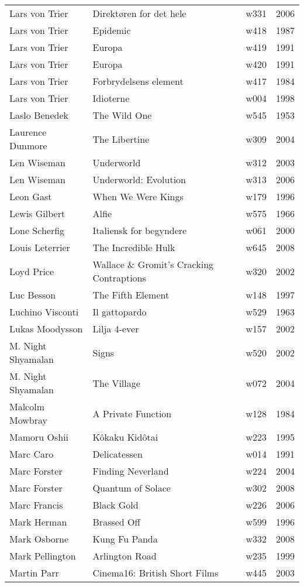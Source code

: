 \documentclass{article}
\begin{document}
\begin {center}
\begin{longtable}{l p{10cm} l l}
Lars von Trier & Direktøren for det hele & w331 & 2006 \\
Lars von Trier & Epidemic & w418 & 1987 \\
Lars von Trier & Europa & w419 & 1991 \\
Lars von Trier & Europa & w420 & 1991 \\
Lars von Trier & Forbrydelsens element & w417 & 1984 \\
Lars von Trier & Idioterne & w004 & 1998 \\
Laslo Benedek & The Wild One & w545 & 1953 \\
Laurence Dunmore & The Libertine & w309 & 2004 \\
Len Wiseman & Underworld & w312 & 2003 \\
Len Wiseman & Underworld: Evolution & w313 & 2006 \\
Leon Gast & When We Were Kings & w179 & 1996 \\
Lewis Gilbert & Alfie & w575 & 1966 \\
Lone Scherfig & Italiensk for begyndere & w061 & 2000 \\
Louis Leterrier & The Incredible Hulk & w645 & 2008 \\
Loyd Price & Wallace \& Gromit's Cracking Contraptions & w320 & 2002 \\
Luc Besson & The Fifth Element & w148 & 1997 \\
Luchino Visconti & Il gattopardo & w529 & 1963 \\
Lukas Moodysson & Lilja 4-ever & w157 & 2002 \\
M. Night Shyamalan & Signs & w520 & 2002 \\
M. Night Shyamalan & The Village & w072 & 2004 \\
Malcolm Mowbray & A Private Function & w128 & 1984 \\
Mamoru Oshii & Kôkaku Kidôtai & w223 & 1995 \\
Marc Caro & Delicatessen & w014 & 1991 \\
Marc Forster & Finding Neverland & w224 & 2004 \\
Marc Forster & Quantum of Solace & w302 & 2008 \\
Marc Francis & Black Gold & w226 & 2006 \\
Mark Herman & Brassed Off & w599 & 1996 \\
Mark Osborne & Kung Fu Panda & w332 & 2008 \\
Mark Pellington & Arlington Road & w235 & 1999 \\
Martin Parr & Cinema16: British Short Films & w445 & 2003 \\

\end{longtable}
\end{center}
\end{document}
